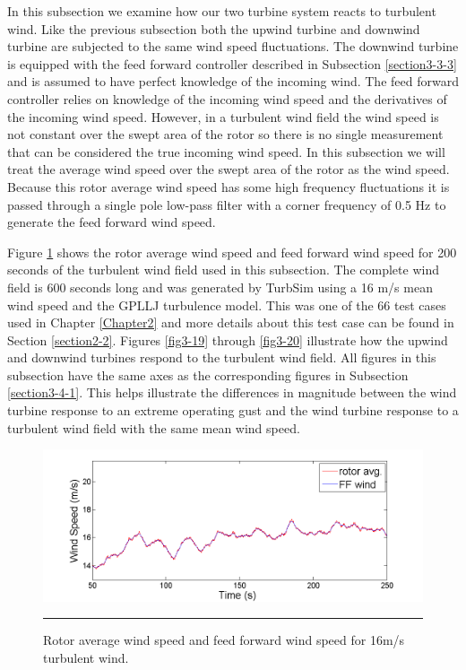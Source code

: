 In this subsection we examine how our two turbine system reacts to turbulent wind. Like the previous subsection both the upwind turbine and downwind turbine are subjected to the same wind speed fluctuations. The downwind turbine is equipped with the feed forward controller described in Subsection \ref{section3-3-3} and is assumed to have perfect knowledge of the incoming wind. The feed forward controller relies on knowledge of the incoming wind speed and the derivatives of the incoming wind speed. However, in a turbulent wind field the wind speed is not constant over the swept area of the rotor so there is no single measurement that can be considered the true incoming wind speed. In this subsection we will treat the average wind speed over the swept area of the rotor as the wind speed. Because this rotor average wind speed has some high frequency fluctuations it is passed through a single pole low-pass filter with a corner frequency of 0.5 Hz to generate the feed forward wind speed.

Figure \ref{fig3-18} shows the rotor average wind speed and feed forward wind speed for 200 seconds of the turbulent wind field used in this subsection. The complete wind field is 600 seconds long and was generated by TurbSim using a 16 m/s mean wind speed and the GPLLJ turbulence model. This was one of the 66 test cases used in Chapter \ref{Chapter2} and more details about this test case can be found in Section \ref{section2-2}. Figures \ref{fig3-19} through \ref{fig3-20} illustrate how the upwind and downwind turbines respond to the turbulent wind field. All figures in this subsection have the same axes as the corresponding figures in Subsection \ref{section3-4-1}. This helps illustrate the differences in magnitude between the wind turbine response to an extreme operating gust and the wind turbine response to a turbulent wind field with the same mean wind speed.

\begin{figure}[htbp]
	\centering
		\includegraphics[trim = {1cm 0 2cm 0}, clip, width = \linewidth]{Figures/ch3Figures/fig3-18.png}
		\rule{35em}{0.5pt}
	\caption{Rotor average wind speed and feed forward wind speed for 16m/s turbulent wind.}
	\label{fig3-18}
\end{figure}

